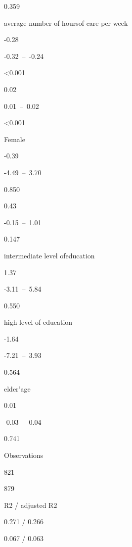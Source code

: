 \documentclass[]{article}
\begin{document}
0.359

average number of hoursof care per week

-0.28

-0.32~--~-0.24

\textless{}0.001

0.02

0.01~--~0.02

\textless{}0.001

Female

-0.39

-4.49~--~3.70

0.850

0.43

-0.15~--~1.01

0.147

intermediate level ofeducation

1.37

-3.11~--~5.84

0.550

high level of education

-1.64

-7.21~--~3.93

0.564

elder'age

0.01

-0.03~--~0.04

0.741

Observations

821

879

R2 / adjusted R2

0.271 / 0.266

0.067 / 0.063
\end{document}
